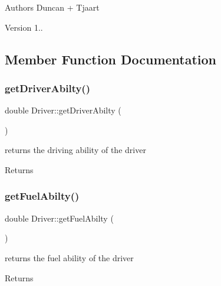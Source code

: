 \begin{DoxyAuthor}{Authors}
Duncan + Tjaart 
\end{DoxyAuthor}
\begin{DoxyVersion}{Version}
1.. 
\end{DoxyVersion}


\subsection{Member Function Documentation}
\mbox{\label{class_driver_a8a2b558c11472305bfd73bc7e86b63c0}} 
\subsubsection{\texorpdfstring{get\+Driver\+Abilty()}{getDriverAbilty()}}
{\footnotesize\ttfamily double Driver\+::get\+Driver\+Abilty (\begin{DoxyParamCaption}{ }\end{DoxyParamCaption})\hspace{0.3cm}{\ttfamily [inline]}}

returns the driving ability of the driver \begin{DoxyReturn}{Returns}

\end{DoxyReturn}
\mbox{\label{class_driver_af41b8ce4a24f7664fca47406d3039657}} 
\subsubsection{\texorpdfstring{get\+Fuel\+Abilty()}{getFuelAbilty()}}
{\footnotesize\ttfamily double Driver\+::get\+Fuel\+Abilty (\begin{DoxyParamCaption}{ }\end{DoxyParamCaption})\hspace{0.3cm}{\ttfamily [inline]}}

returns the fuel ability of the driver \begin{DoxyReturn}{Returns}

\end{DoxyReturn}
\mbox{\label{class_driver_a28a8c99e436c186b6f6e60f5c91aec8f}} 
